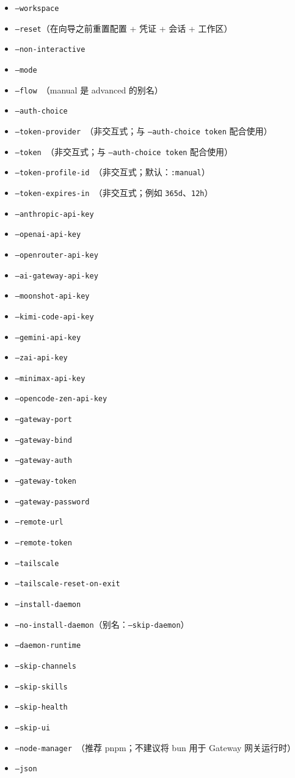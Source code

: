 \begin{itemize}
  \item \texttt{--workspace }
  \item \texttt{--reset}（在向导之前重置配置 + 凭证 + 会话 + 工作区）
  \item \texttt{--non-interactive}
  \item \texttt{--mode }
  \item \texttt{--flow }（manual 是 advanced 的别名）
  \item \texttt{--auth-choice }
  \item \texttt{--token-provider }（非交互式；与 \texttt{--auth-choice token} 配合使用）
  \item \texttt{--token }（非交互式；与 \texttt{--auth-choice token} 配合使用）
  \item \texttt{--token-profile-id }（非交互式；默认：\texttt{:manual}）
  \item \texttt{--token-expires-in }（非交互式；例如 \texttt{365d}、\texttt{12h}）
  \item \texttt{--anthropic-api-key }
  \item \texttt{--openai-api-key }
  \item \texttt{--openrouter-api-key }
  \item \texttt{--ai-gateway-api-key }
  \item \texttt{--moonshot-api-key }
  \item \texttt{--kimi-code-api-key }
  \item \texttt{--gemini-api-key }
  \item \texttt{--zai-api-key }
  \item \texttt{--minimax-api-key }
  \item \texttt{--opencode-zen-api-key }
  \item \texttt{--gateway-port }
  \item \texttt{--gateway-bind }
  \item \texttt{--gateway-auth }
  \item \texttt{--gateway-token }
  \item \texttt{--gateway-password }
  \item \texttt{--remote-url }
  \item \texttt{--remote-token }
  \item \texttt{--tailscale }
  \item \texttt{--tailscale-reset-on-exit}
  \item \texttt{--install-daemon}
  \item \texttt{--no-install-daemon}（别名：\texttt{--skip-daemon}）
  \item \texttt{--daemon-runtime }
  \item \texttt{--skip-channels}
  \item \texttt{--skip-skills}
  \item \texttt{--skip-health}
  \item \texttt{--skip-ui}
  \item \texttt{--node-manager }（推荐 pnpm；不建议将 bun 用于 Gateway 网关运行时）
  \item \texttt{--json}
\end{itemize}


